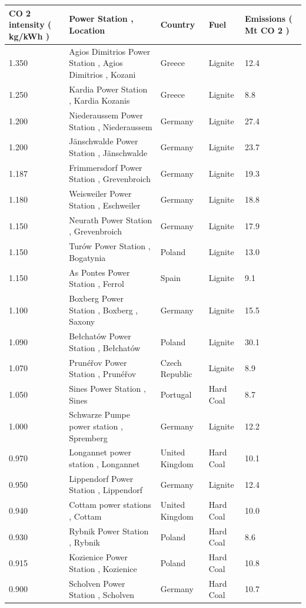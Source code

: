 \documentclass{article}
\begin{document}
\begin{tabular}{lllll}
\toprule
CO 2 intensity ( kg/kWh ) & Power Station , Location & Country & Fuel & Emissions ( Mt CO 2 ) \\
\midrule
1.350 & Agios Dimitrios Power Station , Agios Dimitrios , Kozani & Greece & Lignite & 12.4 \\
1.250 & Kardia Power Station , Kardia Kozanis & Greece & Lignite & 8.8 \\
1.200 & Niederaussem Power Station , Niederaussem & Germany & Lignite & 27.4 \\
1.200 & Jänschwalde Power Station , Jänschwalde & Germany & Lignite & 23.7 \\
1.187 & Frimmersdorf Power Station , Grevenbroich & Germany & Lignite & 19.3 \\
1.180 & Weisweiler Power Station , Eschweiler & Germany & Lignite & 18.8 \\
1.150 & Neurath Power Station , Grevenbroich & Germany & Lignite & 17.9 \\
1.150 & Turów Power Station , Bogatynia & Poland & Lignite & 13.0 \\
1.150 & As Pontes Power Station , Ferrol & Spain & Lignite & 9.1 \\
1.100 & Boxberg Power Station , Boxberg , Saxony & Germany & Lignite & 15.5 \\
1.090 & Bełchatów Power Station , Bełchatów & Poland & Lignite & 30.1 \\
1.070 & Prunéřov Power Station , Prunéřov & Czech Republic & Lignite & 8.9 \\
1.050 & Sines Power Station , Sines & Portugal & Hard Coal & 8.7 \\
1.000 & Schwarze Pumpe power station , Spremberg & Germany & Lignite & 12.2 \\
0.970 & Longannet power station , Longannet & United Kingdom & Hard Coal & 10.1 \\
0.950 & Lippendorf Power Station , Lippendorf & Germany & Lignite & 12.4 \\
0.940 & Cottam power stations , Cottam & United Kingdom & Hard Coal & 10.0 \\
0.930 & Rybnik Power Station , Rybnik & Poland & Hard Coal & 8.6 \\
0.915 & Kozienice Power Station , Kozienice & Poland & Hard Coal & 10.8 \\
0.900 & Scholven Power Station , Scholven & Germany & Hard Coal & 10.7 \\
\bottomrule
\end{tabular}
\end{document}
